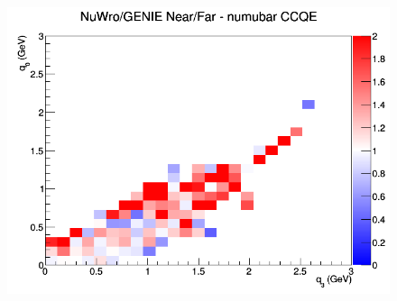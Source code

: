 \documentclass[12pt]{article}
\begin{document}
\begin{figure}[h]
\endminipage
{}
\includegraphics[width=\linewidth]{eff_q0_q3/LAr/ratios/CCQE_NuWro_GENIE_numubar_NF_q3_q0.png}
\endminipage
\newline
\end{figure}
\clearpage
\end{document}

